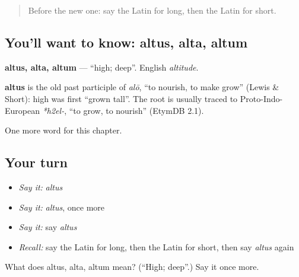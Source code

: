 \label{lesson:LA-C93-altus}



\begin{quote}
Before the new one: say the Latin for long, then the Latin for short.
\end{quote}

\subsection*{You'll want to know: altus, alta, altum}
\textbf{altus, alta, altum} — \textquotedblleft{}high; deep\textquotedblright{}. English \emph{altitude}.

\begin{cousinweb}
\textbf{altus} is the old past participle of \emph{alō}, \textquotedblleft{}to nourish, to make grow\textquotedblright{} (Lewis \& Short): high was first \textquotedblleft{}grown tall\textquotedblright{}. The root is usually traced to Proto-Indo-European \emph{*h2el-}, \textquotedblleft{}to grow, to nourish\textquotedblright{} (EtymDB 2.1).
\end{cousinweb}

\begin{grammarlens}[title={What you've built}]
One more word for this chapter.
\end{grammarlens}

\subsection*{Your turn}
\begin{itemize}
\raggedright
  \item \emph{Say it:} \emph{altus}
  \item \emph{Say it:} \emph{altus}, once more
  \item \emph{Say it:} say \emph{altus}
  \item \emph{Recall:} say the Latin for long, then the Latin for short, then say \emph{altus} again
\end{itemize}

\begin{tcolorbox}[breakable,colback=teal!4,colframe=teal!35!black,title={Before you move on}]
What does altus, alta, altum mean? (\textquotedblleft{}High; deep\textquotedblright{}.) Say it once more.
\end{tcolorbox}
